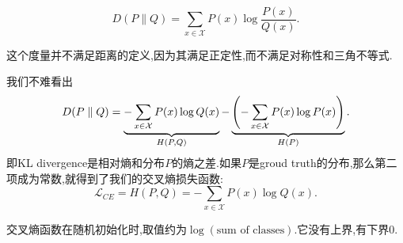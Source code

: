\begin{equation}
	D(P \parallel Q) = \sum_{x \in \mathcal X} P(x) \log \frac{P(x)}{Q(x)}.
\end{equation}

这个度量并不满足距离的定义,因为其满足正定性,而不满足对称性和三角不等式.

我们不难看出
\begin{equation}
	D(P \parallel Q) = \underbrace{-\sum_{x \in \mathcal X} P(x)\log Q(x)}_{H(P, Q)} - \underbrace{\left( -\sum_{x \in \mathcal X} P(x) \log P(x)\right)}_{H(P)}.
\end{equation}
即KL divergence是相对熵和分布$P$的熵之差.如果$P$是groud truth的分布,那么第二项成为常数,就得到了我们的交叉熵损失函数:
\begin{equation}
	\mathcal L_{CE} = H(P, Q) = -\sum_{x \in \mathcal X} P(x) \log Q(x).
\end{equation}

交叉熵函数在随机初始化时,取值约为$\log (\text{sum of classes})$.它没有上界,有下界$0$.